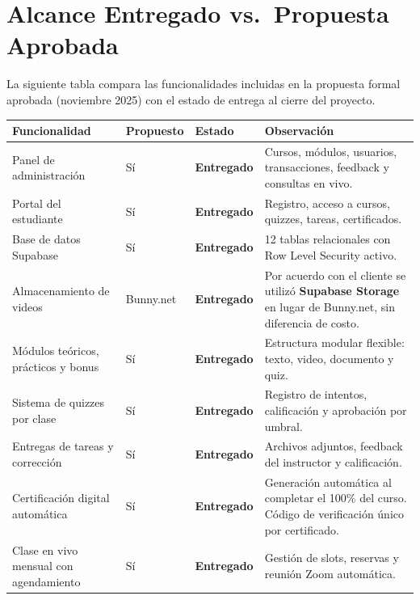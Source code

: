 \documentclass[a4paper,11pt]{article}
\newcommand{\entregado}{\textcolor{checkgreen}{\textbf{Entregado}}}
\begin{document}
\section{Alcance Entregado vs.\ Propuesta Aprobada}

La siguiente tabla compara las funcionalidades incluidas en la propuesta formal aprobada
(noviembre 2025) con el estado de entrega al cierre del proyecto.

\renewcommand{\arraystretch}{1.3}
\begin{longtable}{L{4cm} C{3.5cm} C{2.3cm} L{4.5cm}}
\toprule
\textbf{Funcionalidad} & \textbf{Propuesto} & \textbf{Estado} & \textbf{Observaci\'on} \\
\midrule
\endhead
\bottomrule
\endfoot

Panel de administraci\'on & S\'i & \entregado &
  Cursos, m\'odulos, usuarios, transacciones, feedback y consultas en vivo. \\

Portal del estudiante & S\'i & \entregado &
  Registro, acceso a cursos, quizzes, tareas, certificados. \\

Base de datos Supabase & S\'i & \entregado &
  12 tablas relacionales con Row Level Security activo. \\

Almacenamiento de videos & Bunny.net & \entregado &
  Por acuerdo con el cliente se utiliz\'o \textbf{Supabase Storage}
  en lugar de Bunny.net, sin diferencia de costo. \\

M\'odulos te\'oricos, pr\'acticos y bonus & S\'i & \entregado &
  Estructura modular flexible: texto, video, documento y quiz. \\

Sistema de quizzes por clase & S\'i & \entregado &
  Registro de intentos, calificaci\'on y aprobaci\'on por umbral. \\

Entregas de tareas y correcci\'on & S\'i & \entregado &
  Archivos adjuntos, feedback del instructor y calificaci\'on. \\

Certificaci\'on digital autom\'atica & S\'i & \entregado &
  Generaci\'on autom\'atica al completar el 100\% del curso.
  C\'odigo de verificaci\'on \'unico por certificado. \\

Clase en vivo mensual con agendamiento & S\'i & \entregado &
  Gesti\'on de slots, reservas y reuni\'on Zoom autom\'atica. \\


\end{longtable}
\end{document}
